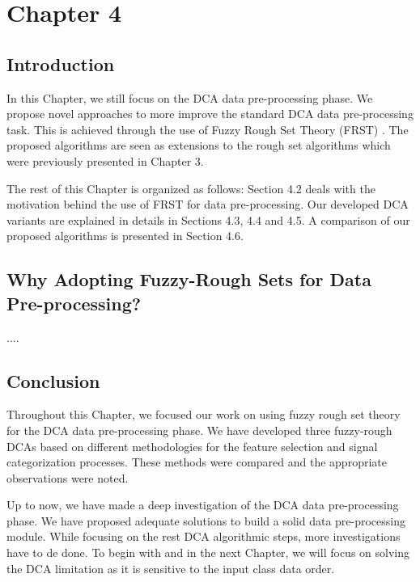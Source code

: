 \chapter{Chapter 4}
\section{Introduction}
In this Chapter, we still focus on the DCA data pre-processing phase. We   propose   novel approaches to more improve  the standard DCA data pre-processing task. This is achieved through the use of Fuzzy Rough Set Theory (FRST) \cite{FRST}. The proposed algorithms are seen as extensions to the   rough  set algorithms which were previously presented in Chapter 3.     

The rest of this Chapter is organized as follows: Section 4.2 deals with the motivation behind the use of  FRST for data pre-processing. Our developed DCA variants are explained in details in Sections 4.3, 4.4 and 4.5. A comparison of our proposed algorithms is presented in Section 4.6.
\section{Why Adopting Fuzzy-Rough Sets for Data Pre-processing?}
....


\section{Conclusion}
Throughout this Chapter, we focused our work on using fuzzy rough set theory for the DCA data pre-processing phase. We have developed three fuzzy-rough DCAs  based on different methodologies for the feature selection and signal categorization processes. These methods were compared  and the appropriate observations were noted.  

Up to now, we have made a deep investigation of the DCA data pre-processing phase.  We have proposed adequate solutions to build a solid data pre-processing module. While focusing on the rest DCA algorithmic steps, more investigations have to de done. To begin with and in the next Chapter, we will   focus on solving the DCA limitation as it is sensitive to the input class data order.





